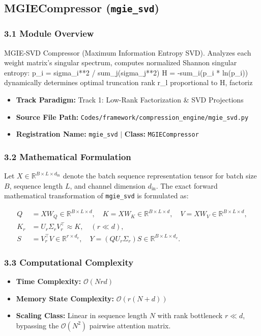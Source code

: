 \subsection{MGIECompressor (\texttt{mgie\_svd})}
\label{sec:app_module_mgie\_svd}

\subsubsection*{3.1 Module Overview}
MGIE-SVD Compressor (Maximum Information Entropy SVD).  Analyzes each weight matrix's singular spectrum, computes normalized Shannon singular entropy:     p\_i = sigma\_i**2 / sum\_j(sigma\_j**2)     H = -sum\_i(p\_i * ln(p\_i)) dynamically determines optimal truncation rank r\_l proportional to H, factoriz
\begin{itemize}
    \item \textbf{Track Paradigm:} Track 1: Low-Rank Factorization & SVD Projections
    \item \textbf{Source File Path:} \texttt{Codes/framework/compression\_engine/mgie\_svd.py}
    \item \textbf{Registration Name:} \texttt{mgie\_svd} $\mid$ \textbf{Class:} \texttt{MGIECompressor}
\end{itemize}

\subsubsection*{3.2 Mathematical Formulation}
Let $X \in \mathbb{R}^{B \times L \times d_{\text{in}}}$ denote the batch sequence representation tensor for batch size $B$, sequence length $L$, and channel dimension $d_{\text{in}}$. The exact forward mathematical transformation of \texttt{mgie\_svd} is formulated as:

\begin{align}
Q &= X W_Q \in \mathbb{R}^{B \times L \times d}, \quad K = X W_K \in \mathbb{R}^{B \times L \times d}, \quad V = X W_V \in \mathbb{R}^{B \times L \times d}, \\
K_r &= U_r \Sigma_r V_r^\top \approx K, \quad (r \ll d), \\
S &= V_r^\top V \in \mathbb{R}^{r \times d_v}, \quad Y = (Q U_r \Sigma_r) S \in \mathbb{R}^{B \times L \times d_v}.
\end{align}


\subsubsection*{3.3 Computational Complexity}
\begin{itemize}
    \item \textbf{Time Complexity:} $\mathcal{O}(N r d)$
    \item \textbf{Memory State Complexity:} $\mathcal{O}(r(N + d))$
    \item \textbf{Scaling Class:} Linear in sequence length $N$ with rank bottleneck $r \ll d$, bypassing the $\mathcal{O}(N^2)$ pairwise attention matrix.
\end{itemize}

